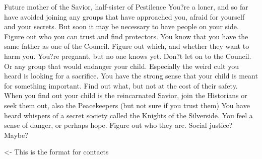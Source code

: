 \documentclass[char]{Silversiders}
\begin{document}
\name{\cOutcast{}}

Future mother of the Savior, half-sister of Pestilence
You?re a loner, and so far have avoided joining any groups that have approached you, afraid for yourself and your secrets. But soon it may be necessary to have people on your side. Figure out who you can trust and find protectors.
You know that you have the same father as one of the Council. Figure out which, and whether they want to harm you.
You?re pregnant, but no one knows yet. Don?t let on to the Council. Or any group that would endanger your child. Especially the weird cult you heard is looking for a sacrifice.
You have the strong sense that your child is meant for something important. Find out what, but not at the cost of their safety.
When you find out your child is the reincarnated Savior, join the Historians or seek them out, also the Peacekeepers (but not sure if you trust them)
You have heard whispers of a secret society called the Knights of the Silverside. You feel a sense of danger, or perhaps hope. Figure out who they are.
Social justice? Maybe?

\begin{itemz}[Goals]
	\item 
\end{itemz}

\begin{itemz}[Notes]
	\item 
\end{itemz}

\begin{contacts}
	\contact{\cTest{}} <- This is the format for contacts 
\end{contacts}
\end{document}

